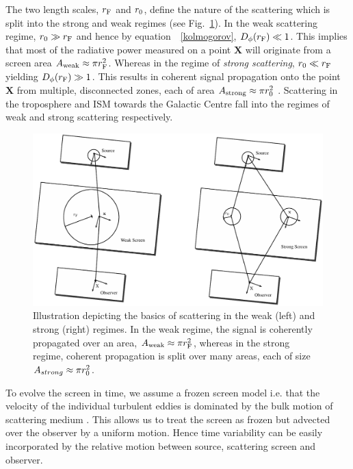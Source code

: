 The two length scales, $r_{\rm F}$ and $r_{\rm 0}$, define the nature of the scattering which is split into the strong and weak regimes (see Fig.~\ref{fig:scatter}). In the weak scattering regime, $ r_{\rm 0} \gg r_{\rm F}$ and hence by equation\ ~\ref{kolmogorov}, $D_{\phi}(r_{\rm F}) \ll 1$. This implies that most of the radiative power measured on a point $\bm{X}$ will originate from a screen area $A_{\rm weak} \approx \pi r_{\rm F}^2$. Whereas in the regime of \emph{strong scattering}, $ r_{\rm 0} \ll r_{\rm F}$ yielding  $D_{\phi}(r_{\rm F}) \gg 1$. This  results in coherent signal propagation onto the point $\bm{X}$ from multiple, disconnected zones, each of area $A_{\rm strong} \approx \pi r_{\rm 0}^2$ \citep{Narayan_1992}. Scattering in the troposphere and ISM towards the Galactic Centre fall into the regimes of weak and strong scattering respectively.

\begin{figure}
\begin{center}
\includegraphics[width=1.\columnwidth]{Images/scatter.pdf}
\caption{Illustration depicting the basics of scattering in the weak (left) and strong (right) regimes. In the weak regime, the signal is coherently propagated over an area, $A_{\rm weak} \approx \pi r_{\rm F}^2$, whereas in the strong regime, coherent propagation is split over many areas, each of size $A_{strong} \approx \pi r_{\rm 0}^2$. \label{fig:scatter}
}
\end{center}
\end{figure}

To evolve the screen in time, we assume a frozen screen model i.e. that the velocity of the individual turbulent eddies is dominated by the bulk motion of scattering medium \citep[e.g.][]{Lay_1997}. This allows us to treat the screen as frozen but advected over the observer by a uniform motion. Hence time variability can be easily incorporated by the relative motion between source, scattering screen and observer.

